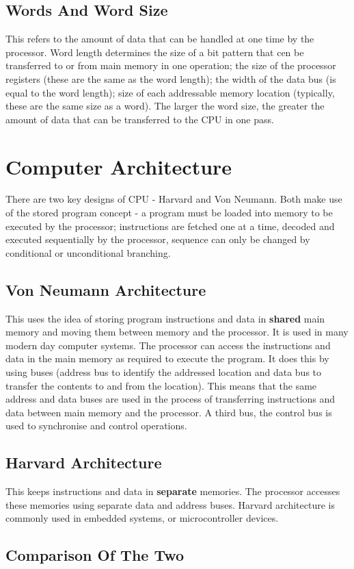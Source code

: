\documentclass[a4paper,11pt, twocolumn]{article}
\begin{document}
\subsection{Words And Word Size}
This refers to the amount of data that can be handled at one time by the processor. Word length determines the size of a bit pattern that cen be transferred to or from main memory in one operation; the size of the processor registers (these are the same as the word length); the width of the data bus (is equal to the word length); size of each addressable memory location (typically, these are the same size as a word). The larger the word size, the greater the amount of data that can be transferred to the CPU in one pass. 

\section{Computer Architecture}
There are two key designs of CPU - Harvard and Von Neumann.
Both make use of the stored program concept - a program must be loaded into memory to be executed by the processor; instructions are fetched one at a time, decoded and executed sequentially by the processor, sequence can only be changed by conditional or unconditional branching.
\subsection{Von Neumann Architecture}
This uses the idea of storing program instructions and data in \textbf{shared} main memory and moving them between memory and the processor. It is used in many modern day computer systems. The processor can access the instructions and data in the main memory as required to execute the program. It does this by using buses (address bus to identify the addressed location and data bus to transfer the contents to and from the location). This means that the same address and data buses are used in the process of transferring instructions and data between main memory and the processor. A third bus, the control bus is used to synchronise and control operations.
\subsection{Harvard Architecture}
This keeps instructions and data in \textbf{separate} memories. The processor accesses these memories using separate data and address buses. Harvard architecture is commonly used in embedded systems, or microcontroller devices. 
\subsection{Comparison Of The Two}
\end{document}
